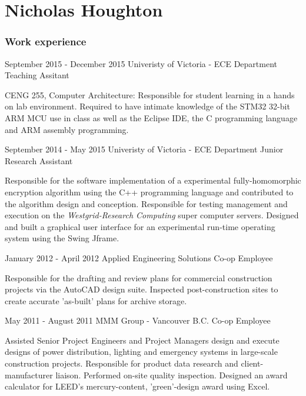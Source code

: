 \documentclass{tccv}
\begin{document}
\part{Nicholas Houghton}

\section{Work experience}

\begin{eventlist}

\item{September 2015 - December 2015}
     {Univeristy of Victoria - ECE Department}
     {Teaching Assitant}

CENG 255, Computer Architecture: Responsible for student learning in a hands on lab environment. Required to 
have intimate knowledge of the STM32 32-bit ARM MCU use in class as well as the Eclipse IDE, the C programming language and ARM assembly programming.

\item{September 2014 - May 2015}
     {Univeristy of Victoria - ECE Department}
     {Junior Research Assistant}

Responsible for the software implementation of a experimental fully-homomorphic encryption algorithm using the C++ programming language and contributed to the algorithm design and conception. Responsible for testing management and execution on the \textit{Westgrid-Research Computing} super computer servers. Designed and built a graphical user interface for an experimental run-time operating system using the Swing Jframe.

\item{January 2012 - April 2012}
     {Applied Engineering Solutions}
     {Co-op Employee}

Responsible for the drafting and review plans for commercial construction projects via the AutoCAD design suite. Inspected post-construction sites to create accurate 'as-built' plans for archive storage.

\item{May 2011 - August 2011}
{MMM Group - Vancouver B.C.}
{Co-op Employee}

Assisted Senior Project Engineers and Project Managers design and execute designs of power distribution, lighting and emergency systems in large-scale construction projects. Responsible for product data research and client-manufacturer liaison. Performed on-site quality inspection. Designed an award calculator for LEED's mercury-content, 'green'-design award using Excel. 


\end{eventlist}
\end{document}
